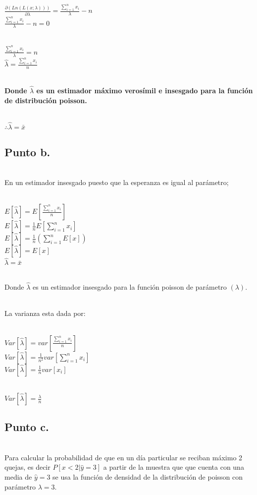\documentclass[letterpaper,12pt,onecolumn,titlepage]{article}
\begin{document}
~\\ $\frac{\partial(Ln(L(x;\lambda)))}{\partial\lambda} = \frac{\sum\limits_{i=1}^n{x_{i}}}{\lambda} - n $
~\\ $\frac{\sum\limits_{i=1}^n{x_{i}}}{\lambda} - n = 0$

~\\ $\frac{\sum\limits_{i=1}^n{x_{i}}}{\lambda} = n $
~\\ $\hat{\lambda} = \frac{\sum\limits_{i=1}^n{x_{i}}}{n}$

~\\ \textbf{Donde $\hat{\lambda}$ es un estimador m\'{a}ximo veros\'{i}mil e insesgado para la funci\'{o}n de distribuci\'{o}n poisson.} 
 
~\\ $\therefore \hat{\lambda} = \bar{x}$

\subsection{Punto b.}
~\\ En un estimador insesgado puesto que la esperanza es igual al par\'{a}metro;


~\\ $E[\hat{\lambda}] = E[\frac{\sum\limits_{i=1}^n{x_{i}}}{n}]$
~\\ $E[\hat{\lambda}] = \frac{1}{n}E[\sum\limits_{i=1}^n{x_{i}}]$
~\\ $E[\hat{\lambda}] = \frac{1}{n}(\sum\limits_{i=1}^{n} E[x])$
~\\ $E[\hat{\lambda}] = E[x]$
~\\ $\hat{\lambda} = \bar{x}$

~\\ Donde $\hat{\lambda}$ es un estimador insesgado para la funci\'{o}n poisson de par\'{a}metro $(\lambda)$. 

~\\ La varianza esta dada por: 


~\\ $Var[\hat{\lambda}]= var[\frac{\sum\limits_{i=1}^n{x_{i}}}{n}]$
~\\ $Var[\hat{\lambda}]= \frac{1}{n^2} var[\sum\limits_{i=1}^n{x_{i}}]$
~\\ $Var[\hat{\lambda}]= \frac{1}{n} var[x_{i}]$

~\\ $Var[\hat{\lambda}]= \frac{\lambda}{n}$

\subsection{Punto c.}
~\\ Para calcular la probabilidad de que en un d\'{i}a particular se reciban m\'{a}ximo 2 quejas, es decir $P[x<2|\hat{y}=3]$ a partir de la muestra que que cuenta con una media de $\hat{y}=3$ se usa la funci\'{o}n de densidad de la distribuci\'{o}n de poisson con par\'{a}metro $\lambda=3$. 
\end{document}
